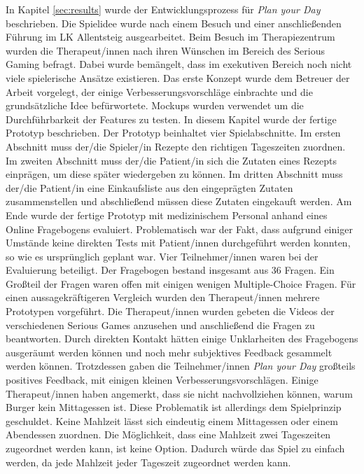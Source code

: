 In Kapitel \ref{sec:results} wurde der Entwicklungsprozess für \textit{Plan your Day} beschrieben. Die Spielidee wurde nach einem Besuch und einer anschließenden Führung im LK Allentsteig ausgearbeitet. Beim Besuch im Therapiezentrum wurden die Therapeut/innen nach ihren Wünschen im Bereich des Serious Gaming befragt. Dabei wurde bemängelt, dass im exekutiven Bereich noch nicht viele spielerische Ansätze existieren. Das erste Konzept wurde dem Betreuer der Arbeit vorgelegt, der einige Verbesserungsvorschläge einbrachte und die grundsätzliche Idee befürwortete. Mockups wurden verwendet um die Durchführbarkeit der Features zu testen. In diesem Kapitel wurde der fertige Prototyp beschrieben. Der Prototyp beinhaltet vier Spielabschnitte. Im ersten Abschnitt muss der/die Spieler/in Rezepte den richtigen Tageszeiten zuordnen. Im zweiten Abschnitt muss der/die Patient/in sich die Zutaten eines Rezepts einprägen, um diese später wiedergeben zu können. Im dritten Abschnitt muss der/die Patient/in eine Einkaufsliste aus den eingeprägten Zutaten zusammenstellen und abschließend müssen diese Zutaten eingekauft werden. Am Ende wurde der fertige Prototyp mit medizinischem Personal anhand eines Online Fragebogens evaluiert. Problematisch war der Fakt, dass aufgrund einiger Umstände keine direkten Tests mit Patient/innen durchgeführt werden konnten, so wie es ursprünglich geplant war. Vier Teilnehmer/innen waren bei der Evaluierung beteiligt. Der Fragebogen bestand insgesamt aus 36 Fragen. Ein Großteil der Fragen waren offen mit einigen wenigen Multiple-Choice Fragen. Für einen aussagekräftigeren Vergleich wurden den Therapeut/innen mehrere Prototypen vorgeführt. Die Therapeut/innen wurden gebeten die Videos der verschiedenen Serious Games anzusehen und anschließend die Fragen zu beantworten. Durch direkten Kontakt hätten einige Unklarheiten des Fragebogens ausgeräumt werden können und noch mehr subjektives Feedback gesammelt werden können. Trotzdessen gaben die Teilnehmer/innen \textit{Plan your Day} großteils positives Feedback, mit einigen kleinen Verbesserungsvorschlägen. Einige Therapeut/innen haben angemerkt, dass sie nicht nachvollziehen können, warum Burger kein Mittagessen ist. Diese Problematik ist allerdings dem Spielprinzip geschuldet. Keine Mahlzeit lässt sich eindeutig einem Mittagessen oder einem Abendessen zuordnen. Die Möglichkeit, dass eine Mahlzeit zwei Tageszeiten zugeordnet werden kann, ist keine Option. Dadurch würde das Spiel zu einfach werden, da jede Mahlzeit jeder Tageszeit zugeordnet werden kann.

